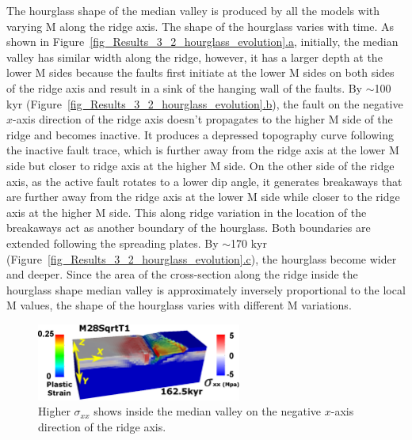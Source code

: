 The hourglass shape of the median valley is produced by all the models with varying M along the ridge axis. The shape of the hourglass varies with time. As shown in Figure~\hyperref[fig_Results_3_2_hourglass_evolution]{\ref{fig_Results_3_2_hourglass_evolution}.a}, initially, the median valley has similar width along the ridge, however, it has a larger depth at the lower M sides because the faults first initiate at the lower M sides on both sides of the ridge axis and result in a sink of the hanging wall of the faults. By $\sim$100 kyr (Figure~\hyperref[fig_Results_3_2_hourglass_evolution]{\ref{fig_Results_3_2_hourglass_evolution}.b}), the fault on the negative $x$-axis direction of the ridge axis doesn't propagates to the higher M side of the ridge and becomes inactive. It produces a depressed topography curve following the inactive fault trace, which is further away from the ridge axis at the lower M side but closer to ridge axis at the higher M side. On the other side of the ridge axis, as the active fault rotates to a lower dip angle, it generates breakaways that are further away from the ridge axis at the lower M side while closer to the ridge axis at the higher M side. This along ridge variation in the location of the breakaways act as another boundary of the hourglass. Both boundaries are extended following the spreading plates. By $\sim$170 kyr (Figure~\hyperref[fig_Results_3_2_hourglass_evolution]{\ref{fig_Results_3_2_hourglass_evolution}.c}), the hourglass become wider and deeper. Since the area of the cross-section along the ridge inside the hourglass shape median valley is approximately inversely proportional to the local M values, the shape of the hourglass varies with different M variations.

\begin{figure}[h]
  \centering
    \includegraphics[width=0.6\textwidth]{./Figures/fig_Results4_7_sqrt_cut_back_conjugate_Sxx.eps}
  \caption{Higher $\sigma_{xx}$ shows inside the median valley on the negative $x$-axis direction of the ridge axis. }
 \label{fig_Results4_7}
\end{figure}

